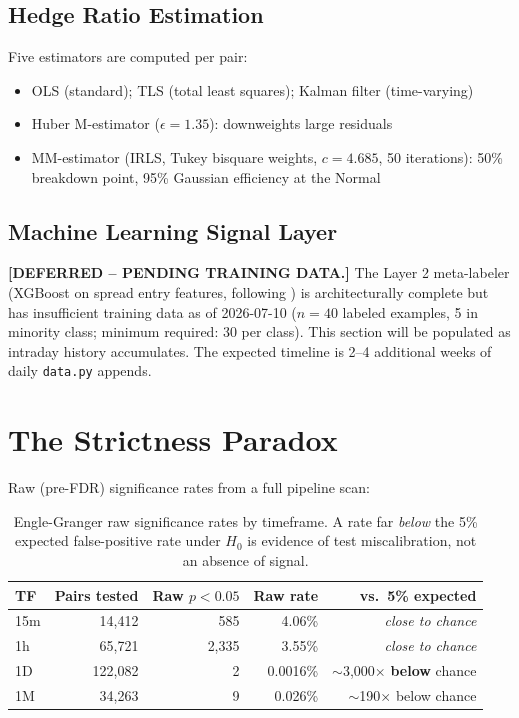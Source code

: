 \documentclass[12pt,a4paper]{article}
\begin{document}
\subsection{Hedge Ratio Estimation}

Five estimators are computed per pair:
\begin{itemize}
  \item OLS (standard); TLS (total least squares); Kalman filter (time-varying)
  \item Huber M-estimator ($\epsilon = 1.35$): downweights large residuals
  \item MM-estimator (IRLS, Tukey bisquare weights, $c = 4.685$, 50 iterations):
    50\% breakdown point, 95\% Gaussian efficiency at the Normal
\end{itemize}

\subsection{Machine Learning Signal Layer}
\label{sec:ml_placeholder}

\textbf{[DEFERRED -- PENDING TRAINING DATA.]}
The Layer 2 meta-labeler (XGBoost on spread entry features, following
\citealt{lopezdeprado2018}) is architecturally complete but has insufficient
training data as of 2026-07-10 ($n=40$ labeled examples, 5 in minority
class; minimum required: 30 per class). This section will be populated as intraday
history accumulates. The expected timeline is 2--4 additional weeks of daily
\texttt{data.py} appends.

\section{The Strictness Paradox}
\label{sec:strictness}

Raw (pre-FDR) significance rates from a full pipeline scan:

\begin{table}[htbp]
\centering
\caption{Engle-Granger raw significance rates by timeframe. A rate far \emph{below}
the 5\% expected false-positive rate under $H_0$ is evidence of test miscalibration,
not an absence of signal.}
\label{tab:strictness}
\small
\begin{tabular}{lrrrr}
\toprule
TF & Pairs tested & Raw $p<0.05$ & Raw rate & vs.\ 5\% expected \\
\midrule
15m & 14,412 & 585 & 4.06\% & \emph{close to chance} \\
1h  & 65,721 & 2,335 & 3.55\% & \emph{close to chance} \\
1D  & 122,082 & 2 & 0.0016\% & $\sim$3,000$\times$ \textbf{below} chance \\
1M  & 34,263 & 9 & 0.026\% & $\sim$190$\times$ below chance \\
\bottomrule
\end{tabular}
\end{table}
\end{document}
